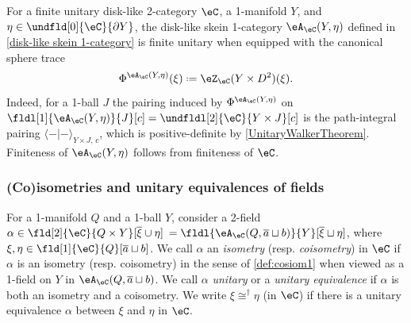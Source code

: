 \documentclass[12pt,reqno]{amsart}
\newcounter{alpha}\renewcommand\thealpha{\upshape\Alph{alpha}}
\newcommand{\psn}{\Phi}
\newcommand{\A}{\eA}
\newcommand{\C}{\eC}
\newcommand{\Z}{\eZ}
\newcommand{\fcj}[1]{\overline{#1}}
\newcommand{\bkt}[2]{\langle #1|#2 \rangle}
\newcommand{\defn}[1]{\emph{#1}}
\renewcommand{\amalg}{\sqcup}
\renewcommand{\star}{\dag}
\DeclareRobustCommand{\coloneq}{\mathrel{\vcenter{\baselineskip0.5ex\lineskiplimit0pt\hbox{\scriptsize{\upshape.}}\hbox{\scriptsize{\upshape.}}}}=}
\begin{document}
\begin{example}
\label{disk-like skein 1-categories are unitary}
For a finite unitary disk-like 2-category $\C$, a 1-manifold $Y$, and $\eta\in\undfld[0]{\C}{\partial Y}$, the disk-like skein 1-category $\A_\C(Y,\eta)$ defined in \cref{disk-like skein 1-category} is finite unitary when equipped with the canonical sphere trace 
\[
\psn^{\A_\C(Y,\eta)}(\xi)
\coloneq
\Z_\C(Y\times D^{2})(\xi).
\]
Indeed, for a 1-ball $J$ the pairing induced by $\psn^{\A_\C(Y,\eta)}$ on $\fldl[1]{\A_\C(Y,\eta)}{J}[c]=\undfldl[2]{\C}{Y\times J}[c]$ is the path-integral pairing $\bkt--_{Y\times J,\,c}$, which is positive-definite by \cref{UnitaryWalkerTheorem}. Finiteness of $\A_\C(Y,\eta)$ follows from finiteness of $\C$.
\end{example}

\subsubsection{(Co)isometries and unitary equivalences of fields}
\label{sec:coisometries-2}

For a 1-manifold $Q$ and a 1-ball $Y$, consider a 2-field $\alpha\in\fld[2]{\C}{Q\times Y}[\fcj\xi\cup\eta]$ $=\fldl{\A_\C(Q,\fcj{a}\amalg b)}{Y}[\fcj{\xi}\amalg \eta]$, where $\xi,\eta\in\fld[1]{\C}{Q}[\fcj{a}\amalg b]$. We call $\alpha$ an \defn{isometry} (resp. \defn{coisometry}) in $\C$ if $\alpha$ is an isometry (resp. coisometry) in the sense of \cref{def:cosiom1} when viewed as a 1-field on $Y$ in $\A_\C(Q,\fcj{a}\amalg b)$. We call $\alpha$ \defn{unitary} or a \defn{unitary equivalence} if $\alpha$ is both an isometry and a coisometry. We write $\xi\cong^\star \eta$ (in $\C$) if there is a unitary equivalence $\alpha$ between $\xi$ and $\eta$ in $\C$.
\end{document}
